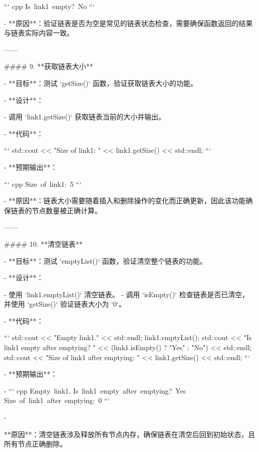   ``` cpp
  Is link1 empty? No
  ```

  

- **原因**：验证链表是否为空是常见的链表状态检查，需要确保函数返回的结果与链表实际内容一致。

------

#### 9. **获取链表大小**

- **目标**：测试 `getSize()` 函数，验证获取链表大小的功能。

- **设计**：

  - 调用 `link1.getSize()` 获取链表当前的大小并输出。

- **代码**：

  ```
  std::cout << "Size of link1: " << link1.getSize() << std::endl;
  ```

- **预期输出**：

  ``` cpp
  Size of link1: 5
  ```

  

- **原因**：链表大小需要随着插入和删除操作的变化而正确更新，因此该功能确保链表的节点数量被正确计算。

------

#### 10. **清空链表**

- **目标**：测试 `emptyList()` 函数，验证清空整个链表的功能。

- **设计**：

  - 使用 `link1.emptyList()` 清空链表。
  - 调用 `isEmpty()` 检查链表是否已清空，并使用 `getSize()` 验证链表大小为 `0`。

- **代码**：

  ```
  std::cout << "Empty link1." << std::endl;
  link1.emptyList();
  std::cout << "Is link1 empty after emptying? " << (link1.isEmpty() ? "Yes" : "No") << std::endl;
  std::cout << "Size of link1 after emptying: " << link1.getSize() << std::endl;
  ```

- **预期输出**：

- ``` cpp
  Empty link1.
  Is link1 empty after emptying? Yes
  Size of link1 after emptying: 0
  ```

- 

  **原因**：清空链表涉及释放所有节点内存，确保链表在清空后回到初始状态，且所有节点正确删除。







